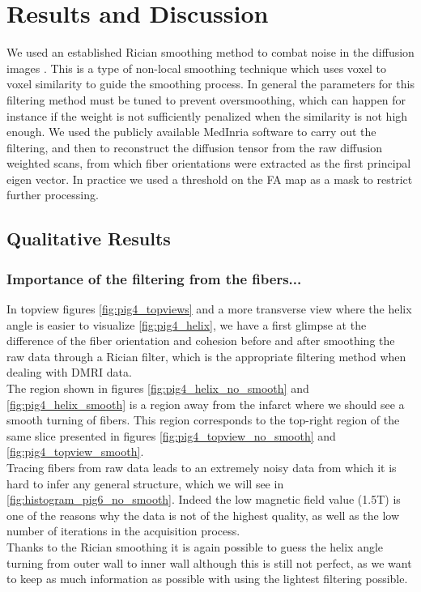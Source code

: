\chapter{Results and Discussion}

We used an established Rician smoothing method to combat noise in the diffusion images \cite{wiest2008rician}. This is a type of non-local smoothing technique which uses voxel to voxel similarity to guide the smoothing process. In general the parameters for this filtering method must be tuned to prevent oversmoothing, which can happen for instance if the weight is not sufficiently penalized when the similarity is not high enough. We used the publicly available MedInria software to carry out the filtering, and then to reconstruct the diffusion tensor from the raw diffusion weighted scans, from which fiber orientations were extracted as the first principal eigen vector. In practice we used a threshold on the FA map as a mask to restrict further processing.

\section{Qualitative Results}

\subsection{Importance of the filtering from the fibers...}

In topview figures \ref{fig:pig4_topviews} and a more transverse view where the helix angle is easier to visualize \ref{fig:pig4_helix}, we have a first glimpse at the difference of the fiber orientation and cohesion before and after smoothing the raw data through a Rician filter, which is the appropriate filtering method when dealing with DMRI data.\\
The region shown in figures \ref{fig:pig4_helix_no_smooth} and \ref{fig:pig4_helix_smooth} is a region away from the infarct where we should see a smooth turning of fibers. This region corresponds to the top-right region of the same slice presented in figures \ref{fig:pig4_topview_no_smooth} and \ref{fig:pig4_topview_smooth}.\\
Tracing fibers from raw data leads to an extremely noisy data from which it is hard to infer any general structure, which we will see in \ref{fig:histogram_pig6_no_smooth}. Indeed the low magnetic field value (1.5T) is one of the reasons why the data is not of the highest quality, as well as the low number of iterations in the acquisition process.\\
Thanks to the Rician smoothing it is again possible to guess the helix angle turning from outer wall to inner wall although this is still not perfect, as we want to keep as much information as possible with using the lightest filtering possible.

